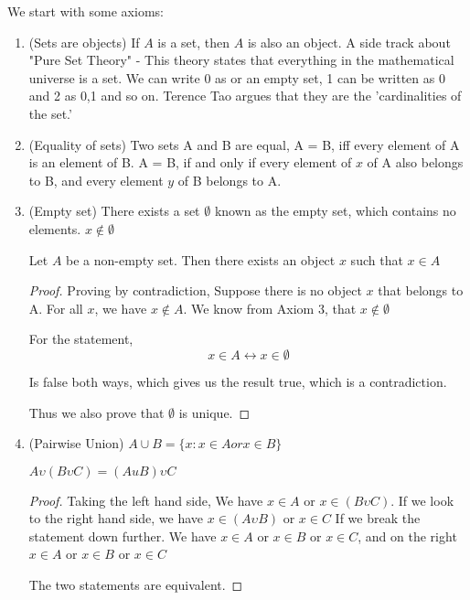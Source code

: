 \documentclass[11pt]{report}
\begin{document}
We start with some axioms:
\begin{enumerate}
        \item (Sets are objects) If $A$ is a set, then $A$ is also an object.
A side track about "Pure Set Theory" - This theory states that everything in the mathematical universe is a set. We can write 0 as {} or an empty set, 1 can be written as {0} and 2 as {0,1} and so on. Terence Tao argues that they are the 'cardinalities of the set.'
        \item (Equality of sets) Two sets A and B are equal, A = B, iff every element of A is an element of B. A = B, if and only if every element of $x$ of A also belongs to B, and every element $y$ of B belongs to A.
        \item (Empty set) There exists a set $\emptyset$ known as the empty set, which contains no elements. $x \notin \emptyset$
\begin{lemma}
        Let $A$ be a non-empty set. Then there exists an object $x$ such that $x \in A$
\end{lemma}
\begin{proof}
Proving by contradiction,
Suppose there is no object $x$ that belongs to A. For all $x$, we have $x \notin A$. We know from Axiom 3, that $x \notin \emptyset$

For the statement,
$$ x \in A \leftrightarrow x \in \emptyset $$

Is false both ways, which gives us the result true, which is a contradiction.

Thus we also prove that $\emptyset$ is unique.
\end{proof}
\item (Pairwise Union) $A \cup B = \{x : x \in A or x \in B\}$
\begin{lemma}
$A \upsilon (B \upsilon C) = (A u B) \upsilon C$
\end{lemma}
\begin{proof}
Taking the left hand side,
We have $x \in A$ or $x \in (B \upsilon C)$. If we look to the right hand side, we have $x \in (A \upsilon B)$ or $ x \in C$
If we break the statement down further.
We have $x \in A$ or $x \in B$ or $x \in C$, and  on the right $x \in A$ or $x \in B$ or $x\in C$

The two statements are equivalent.
\end{proof}
\end{enumerate}
\end{document}

